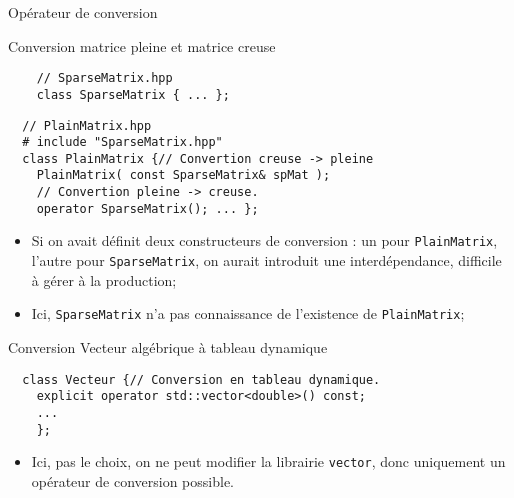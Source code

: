 \documentclass[compress,10pt,aspectratio=169]{beamer}
\begin{document}
  \begin{frame}[fragile]{Opérateur de conversion}
    \scriptsize
    \vspace*{-2mm}
    \begin{exampleblock}{\small Conversion matrice pleine et matrice creuse}
    \begin{multicols}{2}
    \vspace*{-4mm}
    \begin{verbatim}
    // SparseMatrix.hpp
    class SparseMatrix { ... };
    \end{verbatim}
    \columnbreak
    \vspace*{-10mm}
    \begin{verbatim}
  // PlainMatrix.hpp
  # include "SparseMatrix.hpp"
  class PlainMatrix {// Convertion creuse -> pleine
    PlainMatrix( const SparseMatrix& spMat );
    // Convertion pleine -> creuse.
    operator SparseMatrix(); ... };
  \end{verbatim}
  \end{multicols}
  \begin{itemize}
  \item Si on avait définit deux constructeurs de conversion : 
        un pour \texttt{PlainMatrix}, l'autre pour 
        \texttt{SparseMatrix}, on aurait introduit une 
        interdépendance, difficile à gérer à la production;
  \item Ici, \texttt{SparseMatrix} n'a pas connaissance de 
        l'existence de \texttt{PlainMatrix};
  \end{itemize}
  \end{exampleblock}
  \vspace*{-5mm}
  \begin{exampleblock}{\small Conversion Vecteur algébrique à tableau dynamique}
  \begin{verbatim}
  class Vecteur {// Conversion en tableau dynamique.
    explicit operator std::vector<double>() const;
    ...
    };
  \end{verbatim}
  \vspace*{-2mm}
  \begin{itemize}
    \item Ici, pas le choix, on ne peut modifier la librairie 
          \texttt{vector}, donc uniquement un opérateur de conversion 
          possible.
  \end{itemize}
  \end{exampleblock}
  \end{frame}
  
\end{document}
